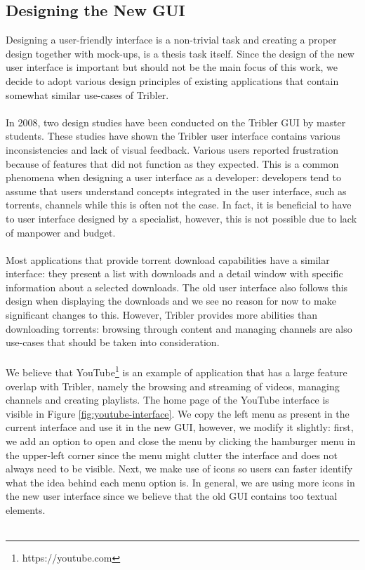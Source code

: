 \subsection{Designing the New GUI}
Designing a user-friendly interface is a non-trivial task and creating a proper design together with mock-ups, is a thesis task itself. Since the design of the new user interface is important but should not be the main focus of this work, we decide to adopt various design principles of existing applications that contain somewhat similar use-cases of Tribler.\\\\
In 2008, two design studies have been conducted on the Tribler GUI by master students\cite{triblerusabilityc2}\cite{triblerusabilityc4}. These studies have shown the Tribler user interface contains various inconsistencies and lack of visual feedback. Various users reported frustration because of features that did not function as they expected. This is a common phenomena when designing a user interface as a developer: developers tend to assume that users understand concepts integrated in the user interface, such as torrents, channels while this is often not the case. In fact, it is beneficial to have to user interface designed by a specialist, however, this is not possible due to lack of manpower and budget.\\\\
Most applications that provide torrent download capabilities have a similar interface: they present a list with downloads and a detail window with specific information about a selected downloads. The old user interface also follows this design when displaying the downloads and we see no reason for now to make significant changes to this. However, Tribler provides more abilities than downloading torrents: browsing through content and managing channels are also use-cases that should be taken into consideration.\\\\
We believe that YouTube\footnote{https://youtube.com} is an example of application that has a large feature overlap with Tribler, namely the browsing and streaming of videos, managing channels and creating playlists. The home page of the YouTube interface is visible in Figure \ref{fig:youtube-interface}. We copy the left menu as present in the current interface and use it in the new GUI, however, we modify it slightly: first, we add an option to open and close the menu by clicking the hamburger menu in the upper-left corner since the menu might clutter the interface and does not always need to be visible. Next, we make use of icons so users can faster identify what the idea behind each menu option is. In general, we are using more icons in the new user interface since we believe that the old GUI contains too textual elements.\\\\
